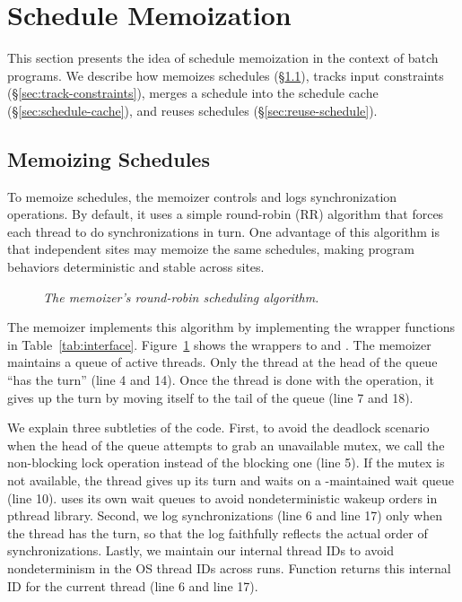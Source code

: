 \section{Schedule Memoization}  \label{sec:batch}

This section presents the idea of schedule memoization in the context of
batch programs.  We describe how \tern memoizes schedules
(\S\ref{sec:derive-schedule}), tracks input constraints
(\S\ref{sec:track-constraints}), merges a schedule into the schedule cache
(\S\ref{sec:schedule-cache}), and reuses schedules
(\S\ref{sec:reuse-schedule}).

\subsection{Memoizing Schedules}  \label{sec:derive-schedule}

To memoize schedules, the memoizer controls and logs synchronization
operations. By default, it uses a simple round-robin (RR) algorithm that
forces each thread to do synchronizations in turn.  One advantage of this
algorithm is that independent sites may memoize the same schedules, making
program behaviors deterministic and stable across sites.

\begin{figure}[t]
\tiny {}
\caption{\small \emph{The memoizer's round-robin scheduling algorithm.}}
\label{fig:memoizer}
\end{figure}

The memoizer implements this algorithm by implementing the wrapper
functions in Table~\ref{tab:interface}.  Figure~\ref{fig:memoizer} shows
the wrappers to  and
.  The memoizer maintains a queue of active
threads.  Only the thread at the head of the queue ``has the turn'' (line
4 and 14).  Once the thread is done with the operation, it gives up the
turn by moving itself to the tail of the queue (line 7 and 18).

We explain three subtleties of the code.  First, to avoid the deadlock
scenario when the head of the queue attempts to grab an unavailable mutex,
we call the non-blocking lock operation instead of the blocking one (line
5).  If the mutex is not available, the thread gives up its turn and waits
on a \tern-maintained wait queue (line 10).  \tern uses its own wait queues
to avoid nondeterministic wakeup orders in pthread library.  Second, we
log synchronizations (line 6 and line 17) only when the thread has the turn, so
that the log faithfully reflects the actual order of synchronizations.
Lastly, we maintain our internal thread IDs to avoid nondeterminism in the
OS thread IDs across runs.  Function  returns this internal ID
for the current thread (line 6 and line 17).

